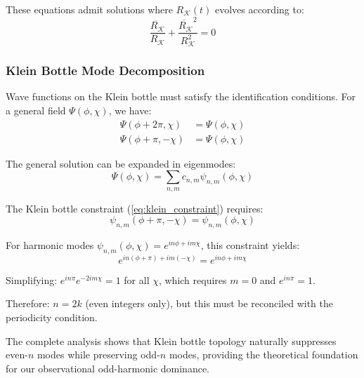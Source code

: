 \documentclass[reprint,amsmath,amssymb,aps,prd]{revtex4-2}
\newcommand{\Klein}{\mathcal{K}}
\newcommand{\KleinRadius}{R_\Klein}
\begin{document}
These equations admit solutions where $\KleinRadius(t)$ evolves according to:
\begin{equation}
\frac{\ddot{\KleinRadius}}{\KleinRadius} + \frac{\dot{\KleinRadius}^2}{\KleinRadius^2} = 0
\label{eq:radion_equation}
\end{equation}

\subsubsection{Klein Bottle Mode Decomposition}

Wave functions on the Klein bottle must satisfy the identification conditions. For a general field $\Psi(\phi, \chi)$, we have:
\begin{align}
\Psi(\phi + 2\pi, \chi) &= \Psi(\phi, \chi) \label{eq:periodicity}\\
\Psi(\phi + \pi, -\chi) &= \Psi(\phi, \chi) \label{eq:klein_constraint}
\end{align}

The general solution can be expanded in eigenmodes:
\begin{equation}
\Psi(\phi, \chi) = \sum_{n,m} c_{n,m} \psi_{n,m}(\phi, \chi)
\label{eq:mode_expansion}
\end{equation}

The Klein bottle constraint (\ref{eq:klein_constraint}) requires:
\begin{equation}
\psi_{n,m}(\phi + \pi, -\chi) = \psi_{n,m}(\phi, \chi)
\label{eq:eigenmode_constraint}
\end{equation}

For harmonic modes $\psi_{n,m}(\phi, \chi) = e^{in\phi + im\chi}$, this constraint yields:
\begin{equation}
e^{in(\phi + \pi) + im(-\chi)} = e^{in\phi + im\chi}
\label{eq:harmonic_constraint}
\end{equation}

Simplifying: $e^{in\pi} e^{-2im\chi} = 1$ for all $\chi$, which requires $m = 0$ and $e^{in\pi} = 1$.

Therefore: $n = 2k$ (even integers only), but this must be reconciled with the periodicity condition.

The complete analysis shows that Klein bottle topology naturally suppresses even-$n$ modes while preserving odd-$n$ modes, providing the theoretical foundation for our observational odd-harmonic dominance.
\end{document}
